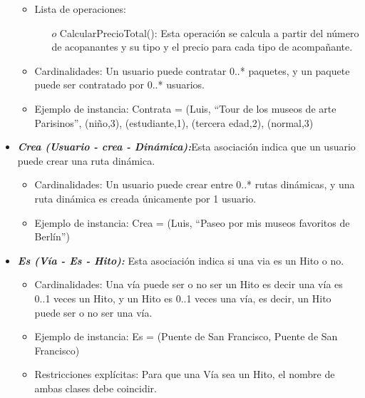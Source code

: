 \documentclass[a4paper]{article}
\begin{document}
\begin{itemize}
{\begin{itemize}
\begin{itemize}
\end{itemize}



\item Lista de operaciones:

\begin{itemize}
\item[$o$] CalcularPrecioTotal(): Esta operación se calcula a partir del número de
acopanantes y su tipo y el precio para cada tipo de acompañante.

\end{itemize}


\item Cardinalidades: Un usuario puede contratar 0..* paquetes, y un paquete puede ser contratado por 0..* usuarios.

\item Ejemplo de instancia: Contrata = {(Luis, “Tour de los museos de arte Parisinos”, {(niño,3), (estudiante,1), (tercera edad,2), (normal,3)}}
  
  
  
   \end{itemize}


}


\item{

	\textbf{\textit{Crea (Usuario - crea - Dinámica):}}Esta asociación indica que un usuario puede crear una ruta dinámica.
  		
        
        
 \begin{itemize}
        
  \item Cardinalidades: Un usuario puede crear entre 0..* rutas dinámicas, y una ruta dinámica es creada únicamente por 1 usuario.
\item Ejemplo de instancia: Crea = {(Luis, “Paseo por mis museos favoritos de Berlín”)}
   \end{itemize}


}


\item{

	\textbf{\textit{Es (Vía - Es - Hito): }}Esta asociación indica si una via es un Hito o no.
  		
        
        
 \begin{itemize}
        
  \item Cardinalidades: Una vía puede ser o no ser un Hito es decir una vía es 0..1 veces un
Hito, y un Hito es 0..1 veces una vía, es decir, un Hito puede ser o no ser una vía.
\item Ejemplo de instancia: Es = {(Puente de San Francisco, Puente de San Francisco)} 
\item Restricciones explícitas: Para que una Vía sea un Hito, el nombre de ambas clases debe coincidir.
   \end{itemize}


}
\end{itemize}
\end{document}
